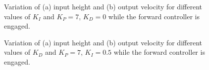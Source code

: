 \begin{figure}[H]
  \centering
  \caption{Variation of (a) input height and (b) output velocity for different values of $K_{I}$ and $K_P=7$, $K_D=0$ while the forward controller is engaged.}\label{fig:tune-fwd-int}
\end{figure}
\begin{figure}[H]
  \centering
  \caption{Variation of (a) input height and (b) output velocity for different values of $K_{D}$ and $K_P=7$, $K_I=0.5$ while the forward controller is engaged.}\label{fig:tune-fwd-der}
\end{figure}


